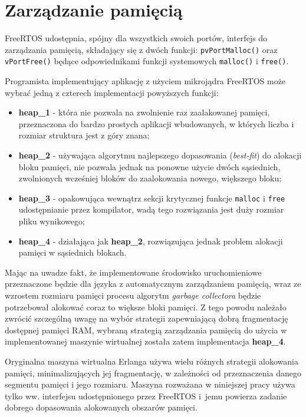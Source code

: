 \section{Zarządzanie pamięcią}
\label{sec:rtosPamiec}

FreeRTOS udostępnia, spójny dla wszystkich swoich portów, interfejs do zarządzania pamięcią, składający się z dwóch funkcji: \texttt{pvPortMalloc()} oraz \texttt{vPortFree()} będące odpowiednikami funkcji systemowych \texttt{malloc()} i \texttt{free()}. 

Programista implementujący aplikację z użyciem mikrojądra FreeRTOS może wybrać jedną z czterech implementacji powyższych funkcji:
\begin{itemize}
\item \textbf{heap\_1} - która nie pozwala na zwolnienie raz zaalakowanej pamięci, przeznaczona do bardzo prostych aplikacji wbudowanych, w których liczba i rozmiar struktura jest z góry znana;
\item \textbf{heap\_2} - używająca algorytmu najlepszego dopasowania (\emph{best-fit}) do alokacji bloku pamięci, nie pozwala jednak na ponowne użycie dwóch sąsiednich, zwolnionych wcześniej bloków do zaalokowania nowego, większego bloku;
\item \textbf{heap\_3} - opakowująca wewnątrz sekcji krytycznej funkcje \texttt{malloc} i \texttt{free} udostępnianie przez kompilator, wadą tego rozwiązania jest duży rozmiar pliku wynikowego;
\item \textbf{heap\_4} - działająca jak \textbf{heap\_2}, rozwiązująca jednak problem alokacji pamięci w sąsiednich blokach.
\end{itemize}

Mając na uwadze fakt, że implementowane środowisko uruchomieniowe przeznaczone będzie dla języka z automatycznym zarządzaniem pamięcią, wraz ze wzrostem rozmiaru pamięci procesu algorytm \emph{garbage collectora} będzie potrzebował alokować coraz to większe bloki pamięci. Z tego powodu należało zwrócić szczególną uwagę na wybór strategii zapewniającą dobrą fragmentację dostępnej pamięci RAM, wybraną strategią zarządzania pamięcią do użycia w implementowanej maszynie wirtualnej została zatem implementacja \textbf{heap\_4}.

Oryginalna maszyna wirtualna Erlanga używa wielu różnych strategii alokowania pamięci, minimalizujących jej fragmentację, w zależności od przeznaczenia danego segmentu pamięci i jego rozmiaru. Maszyna rozważana w niniejszej pracy używa tylko ww. interfejsu udostępnionego przez FreeRTOS i~jemu powierza zadanie dobrego dopasowania alokowanych obszarów pamięci.

